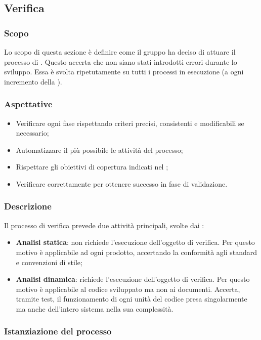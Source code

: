 \subsection{Verifica}
\subsubsection{Scopo}
Lo scopo di questa sezione è definire come il gruppo ha deciso di attuare il processo di . Questo accerta che non siano stati introdotti errori durante lo sviluppo. Essa è svolta ripetutamente su tutti i processi in esecuzione (a ogni incremento della ).

\subsubsection{Aspettative}
\begin{itemize}
	\item Verificare ogni fase rispettando criteri precisi, consistenti e modificabili se necessario;
	\item Automatizzare il più possibile le attività del processo;
	\item Rispettare gli obiettivi di copertura indicati nel \PdQ{};
	\item Verificare correttamente per ottenere successo in fase di validazione.
\end{itemize}

\subsubsection{Descrizione}
Il processo di verifica prevede due attività principali, svolte dai :
\begin{itemize}
	\item \textbf{Analisi statica}: non richiede l'esecuzione dell'oggetto di verifica. Per questo motivo è applicabile ad ogni prodotto, accertando la conformità agli standard e convenzioni di stile;
	\item \textbf{Analisi dinamica}: richiede l'esecuzione dell'oggetto di verifica. Per questo motivo è applicabile al codice sviluppato ma non ai documenti. Accerta, tramite test, il funzionamento di ogni unità del codice presa singolarmente ma anche dell'intero sistema nella sua complessità.
\end{itemize}
\subsubsection{Istanziazione del processo}
